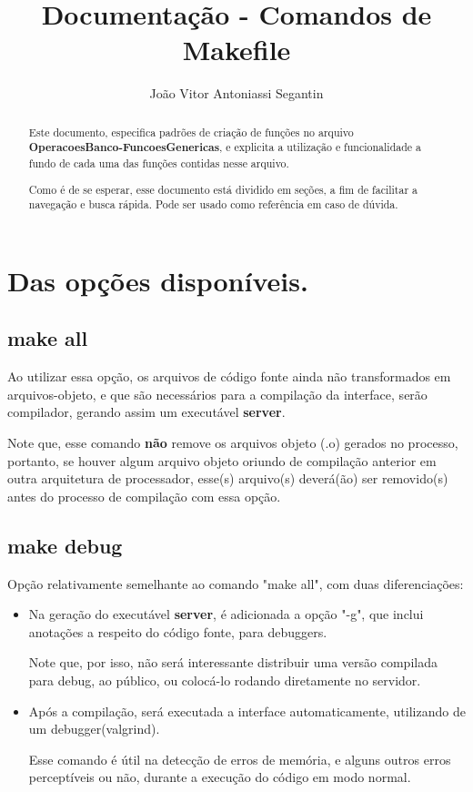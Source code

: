 \documentclass[onecolumn,12pt]{article}
\title{Documentação - Comandos de Makefile}
\author{João Vitor Antoniassi Segantin}
\begin{document}
		\maketitle
		\begin{abstract} \indent
			\par Este documento, especifica padrões de criação de funções no arquivo \textbf{OperacoesBanco-FuncoesGenericas}, e explicita a utilização e funcionalidade a fundo de cada uma das funções contidas nesse arquivo.
			\par Como é de se esperar, esse documento está dividido em seções, a fim de facilitar a navegação e busca rápida. Pode ser usado como referência em caso de dúvida.

		\end{abstract}

		\tableofcontents

		\newpage
		\indent
		
		\section{Das opções disponíveis.}
		
			\subsection{make all}
				Ao utilizar essa opção, os arquivos de código fonte ainda não transformados em arquivos-objeto, e que são necessários para a compilação da interface, serão compilador, gerando assim um executável \textbf{server}.\par
				Note que, esse comando \textbf{não} remove os arquivos objeto (.o) gerados no processo, portanto, se houver algum arquivo objeto oriundo de compilação anterior em outra arquitetura de processador, esse(s) arquivo(s) deverá(ão) ser removido(s) antes do processo de compilação com essa opção.
				
				
			\subsection{make debug}
				Opção relativamente semelhante ao comando "make all", com duas diferenciações:
				\begin{itemize}
					\item Na geração do executável \textbf{server}, é adicionada a opção "-g", que inclui anotações a respeito do código fonte, para debuggers.\par
						Note que, por isso, não será interessante distribuir uma versão compilada para debug, ao público, ou colocá-lo rodando diretamente no servidor.
					\item Após a compilação, será executada a interface automaticamente, utilizando de um debugger(valgrind).\par
						Esse comando é útil na detecção de erros de memória, e alguns outros erros perceptíveis ou não, durante a execução do código em modo normal.
				\end{itemize}
				
\end{document}

